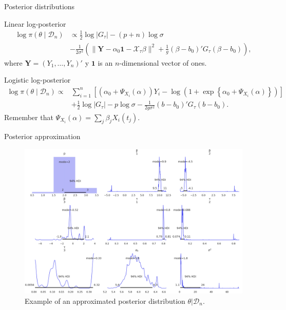 \documentclass[10pt, english, professionalfonts]{beamer}
\newcommand\maroon[1]{\color{mLightBrown}#1\color{mDarkTeal}}
\begin{document}
\begin{frame}{Posterior distributions}
  \begin{block}{Linear log-posterior}
    \vspace{-1em}
    \begin{align*}
  \log \pi(\theta\mid \mathcal D_n) &\propto \frac{1}{2}\log |G_\tau| - (p+n)\log \sigma\\
  &-\frac{1}{2\sigma^2} \left(\|\boldsymbol{Y}-\alpha_0\boldsymbol{1} - \mathcal X_\tau\beta\|^2 + \frac{1}{g}(\beta - b_0)'G_\tau(\beta - b_0) \right),
\end{align*}
where \(\bm Y=(Y_1,\dots,Y_n)'\) y \(\bm{1}\) is an \(n\)-dimensional vector of ones.
  \end{block}

\vspace{1em}
  \begin{block}{Logistic log-posterior}
      \vspace{-1em}
    \begin{align*}
  \log \pi(\theta \mid \mathcal D_n) \propto {} & \sum_{i=1}^n \left[ \left(\alpha_0 + \Psi_{X_i}(\alpha)\right)Y_i - \log\left(1 + \exp\left\{\alpha_0 + \Psi_{X_i}(\alpha)\right\}\right)\right]\\
  \quad &+ \frac{1}{2}\log |G_\tau| - p\log \sigma -\frac{1}{2g\sigma^2} (b - b_0)'G_\tau(b - b_0).
\end{align*}
Remember that \(\Psi_{X_i}(\alpha) = \sum_j \beta_j X_i(t_j)\).
  \end{block}
\end{frame}

\begin{frame}{Posterior approximation}

  \vspace{1em}

  \begin{figure}
    \includegraphics[width=.9\textwidth]{img/posterior}
    \caption{Example of an approximated posterior distribution \(\theta|\mathcal D_n\).}
  \end{figure}
\end{frame}
\end{document}
